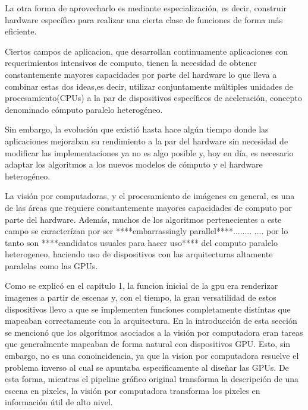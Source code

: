 \documentclass[a4paper,10pt]{report}
\begin{document}
La otra forma de aprovecharlo es mediante especialización, es decir, construir hardware específico para realizar una cierta clase de funciones de forma más eficiente.

Ciertos campos de aplicacion, que desarrollan continuamente aplicaciones con requerimientos intensivos de computo, tienen la necesidad de obtener constantemente mayores capacidades por parte del hardware lo que lleva a combinar estas dos ideas,es decir, utilizar conjuntamente múltiples unidades de procesamiento(CPUs) a la par de dispositivos específicos de aceleración, 
concepto denominado cómputo paralelo heterogéneo.

Sin embargo, la evolución que existió hasta hace algún tiempo donde las aplicaciones mejoraban su rendimiento a la par del hardware sin necesidad de modificar las implementaciones ya no es algo posible y, hoy en día, es necesario
adaptar los algoritmos a los nuevos modelos de cómputo y el hardware heterogéneo.



La visión por computadoras, y el procesamiento de imágenes en general, es una de las áreas que requiere constantemente mayores capacidades de computo por parte del hardware. 
Además, muchos de los algoritmos pertenecientes a este campo se caracterízan por ser  ****embarrassingly parallel****........ ....
por lo tanto son ****candidatos usuales para hacer uso**** del computo paralelo heterogeneo, haciendo uso de dispositivos con las arquitecturas altamente paralelas como las GPUs.

Como se explicó en el capitulo 1, la funcion inicial de la gpu era renderizar imagenes a partir de escenas y, con el tiempo, la gran versatilidad de estos dispositivos llevo a que se implementen funciones completamente distintas que mapeaban correctamente con la arquitectura. 
En la introducción de esta sección se mencionó que los algoritmos asociados a la visión por computadora eran tareas que generalmente mapeaban de forma natural con dispositivos GPU. 
Esto, sin embargo, no es una conoincidencia, ya que la vision por computadora resuelve el problema inverso al cual se apuntaba especificamente al diseñar las GPUs.
De esta forma, mientras el pipeline gráfico original transforma la descripción de una escena en pixeles, la visión por computadora transforma los pixeles en información útil de alto nivel.
\end{document}
